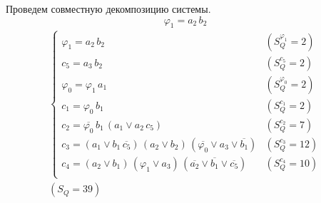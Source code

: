 \documentclass{article}
\begin{document}
\noindent\begin{minipage}{\textwidth}
Проведем совместную декомпозицию системы. \[\varphi_{1} = a_2\,b_2\]
\[\begin{matrix}
    \begin{cases}
        \varphi_{1} = a_2\,b_2 & (S_Q^{\varphi_{1}} = 2) \\
        c_5 = a_3\,b_2 & (S_Q^{c_5} = 2) \\
        \varphi_{0} = \varphi_{1}\,a_1 & (S_Q^{\varphi_{0}} = 2) \\
        c_1 = \varphi_{0}\,b_1 & (S_Q^{c_1} = 2) \\
        c_2 = \overline{\varphi_{0}}\,b_1\,\left(a_1 \lor a_2\,c_5\right) & (S_Q^{c_2} = 7) \\
        c_3 = \left(a_1 \lor b_1\,\overline{c_5}\right)\,\left(a_2 \lor b_2\right)\,\left(\overline{\varphi_{0}} \lor a_3 \lor \overline{b_1}\right) & (S_Q^{c_3} = 12) \\
        c_4 = \left(a_2 \lor b_1\right)\,\left(\varphi_{1} \lor a_3\right)\,\left(\overline{a_2} \lor \overline{b_1} \lor \overline{c_5}\right) & (S_Q^{c_4} = 10) \\
    \end{cases} \\ (S_Q = 39)
\end{matrix}\] \\ \phantom{0}
\end{minipage}
\clearpage
\end{document}
